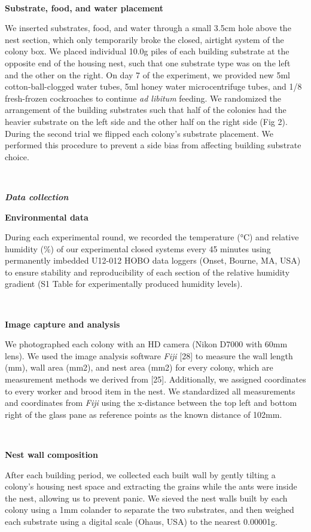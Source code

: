 \documentclass[3p]{elsarticle} %
\begin{document}
~

\textbf{Substrate, food, and water placement}

We inserted substrates, food, and water through a small 3.5cm hole above
the nest section, which only temporarily broke the closed, airtight
system of the colony box. We placed individual 10.0g piles of each
building substrate at the opposite end of the housing nest, such that
one substrate type was on the left and the other on the right. On day 7
of the experiment, we provided new 5ml cotton-ball-clogged water tubes,
5ml honey water microcentrifuge tubes, and 1/8 fresh-frozen cockroaches
to continue \emph{ad libitum} feeding. We randomized the arrangement of
the building substrates such that half of the colonies had the heavier
substrate on the left side and the other half on the right side (Fig 2).
During the second trial we flipped each colony's substrate placement. We
performed this procedure to prevent a side bias from affecting building
substrate choice.

~

\textbf{\emph{Data collection}}

\textbf{Environmental data}

During each experimental round, we recorded the temperature (°C) and
relative humidity (\%) of our experimental closed systems every 45
minutes using permanently imbedded U12-012 HOBO data loggers (Onset,
Bourne, MA, USA) to ensure stability and reproducibility of each section
of the relative humidity gradient (S1 Table for experimentally produced
humidity levels).

~

\textbf{Image capture and analysis}

We photographed each colony with an HD camera (Nikon D7000 with 60mm
lens). We used the image analysis software \emph{Fiji} {[}28{]} to
measure the wall length (mm), wall area (mm2), and nest area (mm2) for
every colony, which are measurement methods we derived from {[}25{]}.
Additionally, we assigned coordinates to every worker and brood item in
the nest. We standardized all measurements and coordinates from
\emph{Fiji} using the x-distance between the top left and bottom right
of the glass pane as reference points as the known distance of 102mm.

~

\textbf{Nest wall composition}

After each building period, we collected each built wall by gently
tilting a colony's housing nest space and extracting the grains while
the ants were inside the nest, allowing us to prevent panic. We sieved
the nest walls built by each colony using a 1mm colander to separate the
two substrates, and then weighed each substrate using a digital scale
(Ohaus, USA) to the nearest 0.00001g.
\end{document}
